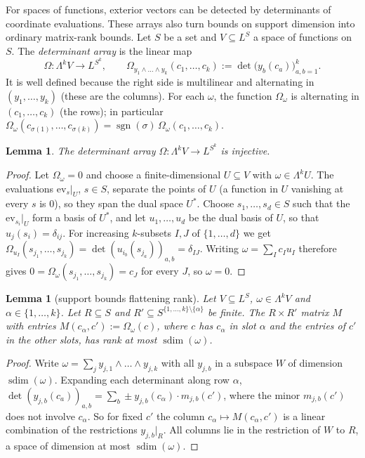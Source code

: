 \documentclass[11pt]{amsart}
\newtheorem{lemma}[theorem]{Lemma}
\theoremstyle{definition}
\theoremstyle{remark}
\numberwithin{equation}{section}
\newcommand{\sgn}{\operatorname{sgn}}
\newcommand{\sdim}{\operatorname{sdim}}
\theoremstyle{plain}
\theoremstyle{definition}
\theoremstyle{plain}
\begin{document}
For spaces of functions, exterior vectors can be detected by determinants of coordinate evaluations. These arrays
also turn bounds on support dimension into ordinary matrix-rank bounds.
Let $S$ be a set and $V\subseteq L^S$ a space of functions on $S$. The \emph{determinant array} is the linear map
\[
\Omega\colon\Lambda^kV\to L^{S^k},\qquad \Omega_{y_1\wedge\dots\wedge y_k}(c_1,\dots,c_k):=\det\bigl(y_b(c_a)\bigr)_{a,b=1}^k .
\]
It is well defined because the right side is multilinear and alternating in $(y_1,\dots,y_k)$ (these are the
columns). For each $\omega$, the function $\Omega_\omega$ is alternating in $(c_1,\dots,c_k)$ (the rows); in particular
$\Omega_\omega(c_{\sigma(1)},\dots,c_{\sigma(k)})=\sgn(\sigma)\,\Omega_\omega(c_1,\dots,c_k)$.

\begin{lemma}\label{lem:detinj}
The determinant array $\Omega\colon\Lambda^kV\to L^{S^k}$ is injective.
\end{lemma}

\begin{proof}
Let $\Omega_\omega=0$ and choose a finite-dimensional $U\subseteq V$ with $\omega\in\Lambda^kU$. The evaluations
$\mathrm{ev}_s|_U$, $s\in S$, separate the points of $U$ (a function in $U$ vanishing at every $s$ is $0$), so they span
the dual space $U^*$. Choose $s_1,\dots,s_d\in S$ such that the $\mathrm{ev}_{s_i}|_U$ form a basis of $U^*$, and let
$u_1,\dots,u_d$ be the dual basis of $U$, so that $u_j(s_i)=\delta_{ij}$. For increasing $k$\nobreakdash-subsets $I,J$ of
$\{1,\dots,d\}$ we get $\Omega_{u_I}(s_{j_1},\dots,s_{j_k})=\det(u_{i_b}(s_{j_a}))_{a,b}=\delta_{IJ}$. Writing
$\omega=\sum_Ic_Iu_I$ therefore gives $0=\Omega_\omega(s_{j_1},\dots,s_{j_k})=c_J$ for every $J$, so $\omega=0$.
\end{proof}

\begin{lemma}[support bounds flattening rank]\label{lem:flat}
Let $V\subseteq L^S$, $\omega\in\Lambda^kV$ and $\alpha\in\{1,\dots,k\}$. Let $R\subseteq S$ and
$R'\subseteq S^{\{1,\dots,k\}\setminus\{\alpha\}}$ be finite. The $R\times R'$ matrix $M$ with entries
$M(c_\alpha,c'):=\Omega_\omega(c)$, where $c$ has $c_\alpha$ in slot $\alpha$ and the entries of $c'$ in the other
slots, has rank at most $\sdim(\omega)$.
\end{lemma}

\begin{proof}
Write $\omega=\sum_jy_{j,1}\wedge\dots\wedge y_{j,k}$ with all $y_{j,b}$ in a subspace $W$ of dimension $\sdim(\omega)$.
Expanding each determinant along row $\alpha$,
$\det(y_{j,b}(c_a))_{a,b}=\sum_b\pm y_{j,b}(c_\alpha)\cdot m_{j,b}(c')$, where the minor $m_{j,b}(c')$ does not
involve $c_\alpha$. So for fixed $c'$ the column $c_\alpha\mapsto M(c_\alpha,c')$ is a linear combination of the
restrictions $y_{j,b}|_R$. All columns lie in the restriction of $W$ to $R$, a space of dimension at most
$\sdim(\omega)$.
\end{proof}
\end{document}
